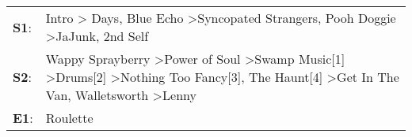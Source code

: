 \begin{supertabular}{p{0.03\textwidth}p{0.92\textwidth}}
 \textbf{S1}:  &                                                                                                                                                Intro\textsuperscript{} \textgreater {} Days\textsuperscript{}, \enspace Blue Echo\textsuperscript{} \textgreater \enspace Syncopated Strangers\textsuperscript{}, \enspace Pooh Doggie\textsuperscript{} \textgreater \enspace JaJunk\textsuperscript{}, \enspace 2nd Self\textsuperscript{}  \enspace  \\
 \textbf{S2}:  &  Wappy Sprayberry\textsuperscript{} \textgreater \enspace Power of Soul\textsuperscript{} \textgreater \enspace Swamp Music[1]\textsuperscript{} \textgreater \enspace Drums[2]\textsuperscript{} \textgreater \enspace Nothing Too Fancy[3]\textsuperscript{}, \enspace The Haunt[4]\textsuperscript{} \textgreater \enspace Get In The Van\textsuperscript{}, \enspace Walletsworth\textsuperscript{} \textgreater \enspace Lenny\textsuperscript{}  \enspace  \\
 \textbf{E1}:  &                                                                                                                                                                                                                                                                                                                                                                                                                            Roulette\textsuperscript{}  \enspace  \\
\end{supertabular}
